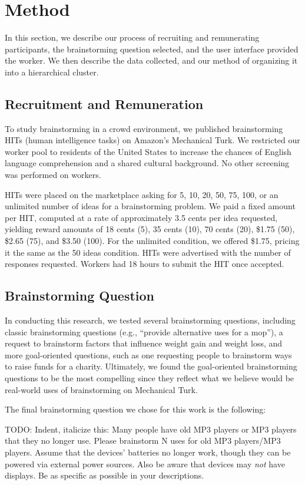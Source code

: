 \section{Method}
In this section, we describe our process of recruiting and remunerating participants, the brainstorming question selected, and the user interface provided the worker. We then describe the data collected, and our method of organizing it into a hierarchical cluster.

\subsection{Recruitment and Remuneration}
To study brainstorming in a crowd environment, we published brainstorming HITs (human intelligence tasks) on Amazon's Mechanical Turk. We restricted our worker pool to residents of the United States to increase the chances of English language comprehension and a shared cultural background. No other screening was performed on workers.

HITs were placed on the marketplace asking for 5, 10, 20, 50, 75, 100, or an unlimited number of ideas for a brainstorming problem. We paid a fixed amount per HIT, computed at a rate of approximately 3.5 cents per idea requested, yielding reward amounts of 18 cents (5), 35 cents (10), 70 cents (20), \$1.75 (50), \$2.65 (75), and \$3.50 (100). For the unlimited condition, we offered \$1.75, pricing it the same as the 50 ideas condition. HITs were advertised with the number of responses requested. Workers had 18 hours to submit the HIT once accepted.

\subsection{Brainstorming Question}
In conducting this research, we tested several brainstorming questions, including classic brainstorming questions (e.g., ``provide alternative uses for a mop''), a request to brainstorm factors that influence weight gain and weight loss, and more goal-oriented questions, such as one requesting people to brainstorm ways to raise funds for a charity. Ultimately, we found the goal-oriented brainstorming questions to be the most compelling since they reflect what we believe would be real-world uses of brainstorming on Mechanical Turk.

The final brainstorming question we chose for this work is the following:

TODO: Indent, italicize this:
Many people have old MP3 players or MP3 players that they no longer use. Please brainstorm N uses for old MP3 players/MP3 players. Assume that the devices' batteries no longer work, though they can be powered via external power sources. Also be aware that devices may \emph{not} have displays. Be as specific as possible in your descriptions.


